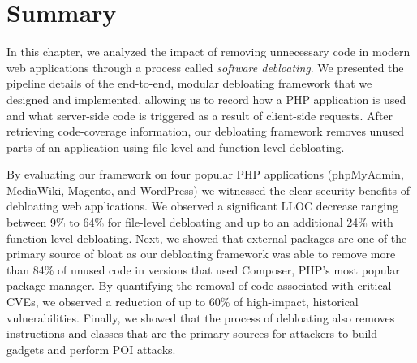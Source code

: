 \section{Summary}

In this chapter, we analyzed the impact of removing unnecessary code in modern
web applications through a process called \textit{software debloating}.
We presented the pipeline details of the end-to-end, modular debloating
framework that we designed and implemented, allowing us to record how a
PHP application is used and what server-side code is triggered as a result of
client-side requests. After retrieving code-coverage information, our debloating
framework removes unused parts of
an application using file-level and function-level debloating.

By evaluating
our framework on four popular PHP applications (phpMyAdmin, MediaWiki,
Magento, and WordPress) we witnessed the clear security benefits of debloating web
applications. We observed a significant LLOC decrease ranging between
9\% to 64\% for file-level debloating and up to an additional 24\% with
function-level debloating. Next, we showed that external packages are one
of the primary source of bloat as our debloating framework was able to remove
more than 84\% of unused code in versions that used Composer, PHP's most popular
package manager. By quantifying the removal of code associated with critical
CVEs, we observed a reduction of up to 60\% of high-impact, historical vulnerabilities.
Finally, we showed that the process of debloating also removes
instructions and classes that are the primary sources for attackers to build
gadgets and perform POI attacks.

